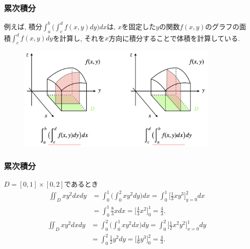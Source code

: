 \begin{frame}
\frametitle{累次積分}

例えば, 積分$\int_a^b\big( \int_c^d f(x,y)dy\big)dx$は, $x$を固定した$y$の関数$f(x,y)$のグラフの面積$\int_c^d f(x,y)dy$を計算し, 
それを$x$方向に積分することで体積を計算している. 

\begin{figure}[htbp]
 \begin{center} 
  \includegraphics[width=100mm]{calculus13/2dir.png}
 \end{center}
\end{figure}

\end{frame}




\begin{frame}
\frametitle{累次積分}



$D=[0,1]\times [0,2]$であるとき
\begin{align*}
\iint_Dxy^2 dxdy &= \int_0^1\big( \int_0^2 xy^2dy\big)dx = \int_0^1\big[\frac{1}{3}xy^3\big]_{y=0}^2dx\\
& = \int_0^1 \frac{8}{3}xdx  = \big[ \frac{4}{3}x^2\big]_0^1=\frac{4}{3}. 
\end{align*}
\begin{align*}
\iint_Dxy^2 dxdy &= \int_0^2\big( \int_0^1 xy^2dx\big)dy = \int_0^2\big[\frac{1}{2}x^2y^2\big]_{x=0}^1dy\\
& = \int_0^2 \frac{1}{2}y^2dy  = \big[ \frac{1}{6}y^3\big]_0^2=\frac{4}{3}. 
\end{align*}

\end{frame}





